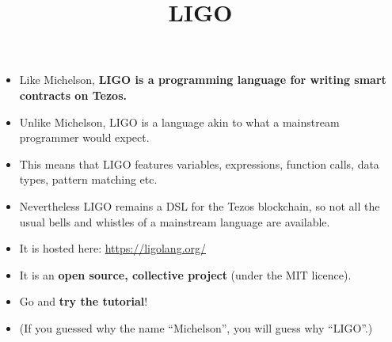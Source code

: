 \documentclass[wide]{slides}
\begin{document}
\begin{slide}
  \title{LIGO}

  \begin{itemize}

    \item Like Michelson, \textbf{LIGO is a programming language for
      writing smart contracts on Tezos.}

    \item Unlike Michelson, LIGO is a language akin to what a
      mainstream programmer would expect.

    \item This means that LIGO features variables, expressions,
      function calls, data types, pattern matching etc.

    \item Nevertheless LIGO remains a DSL for the Tezos blockchain, so
      not all the usual bells and whistles of a mainstream language
      are available.

    \item It is hosted here: \url{https://ligolang.org/}

    \item It is an \textbf{open source, collective project} (under the
      MIT licence).

    \item Go and \textbf{try the tutorial}!

    \item (If you guessed why the name ``Michelson'', you will guess
      why ``LIGO''.)

  \end{itemize}

\end{slide}
\end{document}

